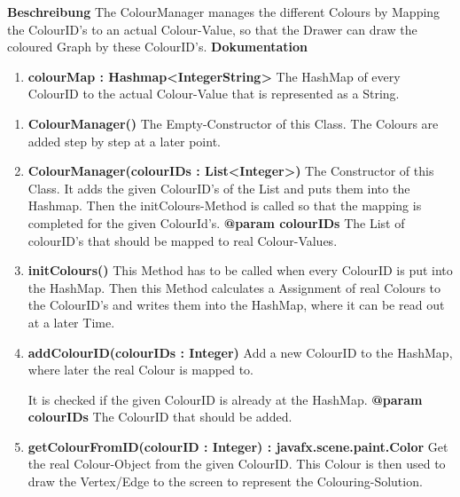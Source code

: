 				\textbf{Beschreibung}\newline
				The ColourManager manages the different Colours by Mapping the ColourID's to an actual Colour-Value, so that the Drawer can draw the coloured Graph by these ColourID's.
				\textbf{Dokumentation}\newline
				\begin{enumerate}[-]
					\item{
						\textbf{colourMap : Hashmap<IntegerString>} \newline
						The HashMap of every ColourID to the actual Colour-Value that is represented as a String.
					}
				\end{enumerate}
				\begin{enumerate}[+]
					\item{
						\textbf{ColourManager()} \newline
						The Empty-Constructor of this Class.
						The Colours are added step by step at a later point.
						\newline
					}
					\item{
						\textbf{ColourManager(colourIDs : List<Integer>)} \newline
						The Constructor of this Class.
						It adds the given ColourID's of the List and puts them into the Hashmap.
						Then the initColours-Method is called so that the mapping is completed for the given ColourId's.
						\newline
						\textbf{@param colourIDs}
							The List of colourID's that should be mapped to real Colour-Values.
							\newline
					}
					\item{
						\textbf{initColours()} \newline
						This Method has to be called when every ColourID is put into the HashMap.
						Then this Method calculates a Assignment of real Colours to the ColourID's and writes them into the HashMap, where it can be read out at a later Time.
						\newline
					}
					\item{
						\textbf{addColourID(colourIDs : Integer)} \newline
						Add a new ColourID to the HashMap, where later the real Colour is mapped to.
						
						It is checked if the given ColourID is already at the HashMap.
						\newline
						\textbf{@param colourIDs}
							The ColourID that should be added.
							\newline
					}
					\item{
						\textbf{getColourFromID(colourID : Integer) : javafx.scene.paint.Color} \newline
						Get the real Colour-Object from the given ColourID.
						This Colour is then used to draw the Vertex/Edge to the screen to represent the Colouring-Solution.
						
}
\end{enumerate}
